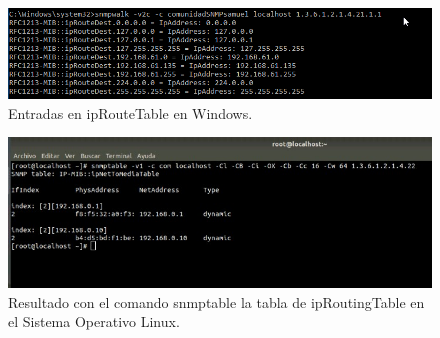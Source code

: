 \FloatBarrier
\begin{figure}[htbp!]
		\centering
			\includegraphics[width=.9 \textwidth]{images/9-windows}
		\caption{Entradas en ipRouteTable en Windows.}
		\label{image:route-windows}
\end{figure}
\FloatBarrier

\FloatBarrier
\begin{figure}[htbp!]
		\centering
			\includegraphics[width=.9 \textwidth]{images/8}
		\caption{Resultado con el comando snmptable la tabla de ipRoutingTable en el Sistema Operativo Linux.}
		\label{image:route-windows}
\end{figure}
\FloatBarrier

